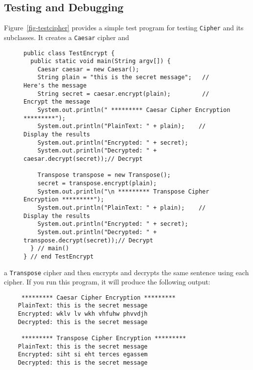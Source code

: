 \subsection{Testing and Debugging}
\noindent Figure~\ref{fig-testcipher} provides a simple test program for testing
{\tt Cipher} and its subclasses.  It creates a {\tt Caesar} cipher and
\begin{figure}[tb]
\jjjprogstart
\begin{jjjlisting}[35pc]
\begin{lstlisting}
public class TestEncrypt {
  public static void main(String argv[]) {
    Caesar caesar = new Caesar();
    String plain = "this is the secret message";   // Here's the message
    String secret = caesar.encrypt(plain);         // Encrypt the message
    System.out.println(" ********* Caesar Cipher Encryption *********");
    System.out.println("PlainText: " + plain);    // Display the results
    System.out.println("Encrypted: " + secret);
    System.out.println("Decrypted: " + caesar.decrypt(secret));// Decrypt

    Transpose transpose = new Transpose();
    secret = transpose.encrypt(plain);
    System.out.println("\n ********* Transpose Cipher Encryption *********");
    System.out.println("PlainText: " + plain);    // Display the results
    System.out.println("Encrypted: " + secret);
    System.out.println("Decrypted: " + transpose.decrypt(secret));// Decrypt
  } // main()
} // end TestEncrypt

\end{lstlisting}
\end{jjjlisting}
\end{figure}
a {\tt Transpose} cipher and then encrypts and decrypts the same
sentence using each cipher.  If you run this program, it will produce
the following output:

\begin{jjjlisting}
\begin{lstlisting}
     ********* Caesar Cipher Encryption *********
    PlainText: this is the secret message
    Encrypted: wklv lv wkh vhfuhw phvvdjh
    Decrypted: this is the secret message

     ********* Transpose Cipher Encryption *********
    PlainText: this is the secret message
    Encrypted: siht si eht terces egassem
    Decrypted: this is the secret message
\end{lstlisting}
\end{jjjlisting}

